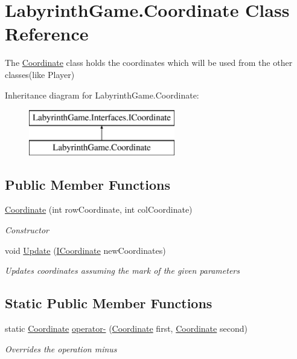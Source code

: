 \hypertarget{class_labyrinth_game_1_1_coordinate}{\section{Labyrinth\+Game.\+Coordinate Class Reference}
\label{class_labyrinth_game_1_1_coordinate}
}


The \hyperlink{class_labyrinth_game_1_1_coordinate}{Coordinate} class holds the coordinates which will be used from the other classes(like Player)  


Inheritance diagram for Labyrinth\+Game.\+Coordinate\+:\begin{figure}[H]
\begin{center}
\leavevmode
\includegraphics[height=2.000000cm]{class_labyrinth_game_1_1_coordinate}
\end{center}
\end{figure}
\subsection*{Public Member Functions}
\begin{DoxyCompactItemize}
\item 
\hyperlink{class_labyrinth_game_1_1_coordinate_a28179b93dd647822685cd8f94740e91e}{Coordinate} (int row\+Coordinate, int col\+Coordinate)
\begin{DoxyCompactList}\small\item\em Constructor \end{DoxyCompactList}\item 
void \hyperlink{class_labyrinth_game_1_1_coordinate_aa051ffb8f95af1633dafaebd72fbb90e}{Update} (\hyperlink{interface_labyrinth_game_1_1_interfaces_1_1_i_coordinate}{I\+Coordinate} new\+Coordinates)
\begin{DoxyCompactList}\small\item\em Updates coordinates assuming the mark of the given parameters \end{DoxyCompactList}\end{DoxyCompactItemize}
\subsection*{Static Public Member Functions}
\begin{DoxyCompactItemize}
\item 
static \hyperlink{class_labyrinth_game_1_1_coordinate}{Coordinate} \hyperlink{class_labyrinth_game_1_1_coordinate_a3df5678bab1c002539e80b7420edf908}{operator-\/} (\hyperlink{class_labyrinth_game_1_1_coordinate}{Coordinate} first, \hyperlink{class_labyrinth_game_1_1_coordinate}{Coordinate} second)
\begin{DoxyCompactList}\small\item\em Overrides the operation minus \end{DoxyCompactList}\end{DoxyCompactItemize}
